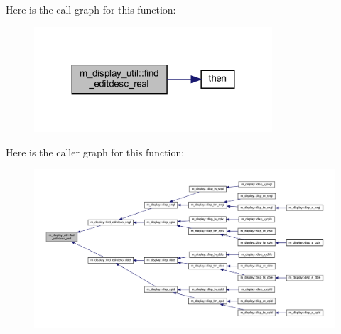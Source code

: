 Here is the call graph for this function\+:
\nopagebreak
\begin{figure}[H]
\begin{center}
\leavevmode
\includegraphics[width=251pt]{namespacem__display__util_abcd2aebb4cd373005b4d1fc4359a2d01_cgraph}
\end{center}
\end{figure}
Here is the caller graph for this function\+:
\nopagebreak
\begin{figure}[H]
\begin{center}
\leavevmode
\includegraphics[width=350pt]{namespacem__display__util_abcd2aebb4cd373005b4d1fc4359a2d01_icgraph}
\end{center}
\end{figure}
\mbox{\label{namespacem__display__util_a056732cc150994b9abe25ed0d72ebee4}} 
